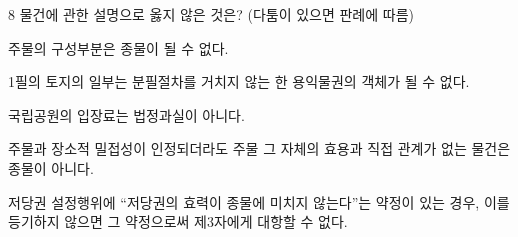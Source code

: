\begin{question}{8}
물건에 관한 설명으로 옳지 않은 것은? (다툼이 있으면 판례에 따름)
\begin{choices}
  \item 주물의 구성부분은 종물이 될 수 없다.
  \item 1필의 토지의 일부는 분필절차를 거치지 않는 한 용익물권의 객체가 될 수 없다.
  \item 국립공원의 입장료는 법정과실이 아니다.
  \item 주물과 장소적 밀접성이 인정되더라도 주물 그 자체의 효용과 직접 관계가 없는 물건은 종물이 아니다.
  \item 저당권 설정행위에 “저당권의 효력이 종물에 미치지 않는다”는 약정이 있는 경우, 이를 등기하지 않으면 그 약정으로써 제3자에게 대항할 수 없다.
\end{choices}
\end{question}
